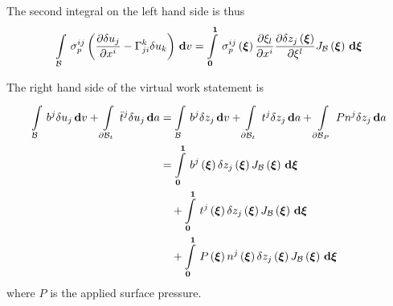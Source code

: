 The second integral on the left hand side is thus
\begin{equation}
  \gint{\embedmanifold{B}}{}{\sigma^{ij}_{p}\pbrac{\delby{\delta
        u_{j}}{x^{i}}-\christoffel{k}{j}{i}\delta u_{k}}}{v}=
  \gint{\vectr{0}}{\vectr{1}}{\fnof{\sigma^{ij}_{p}}{\vectr{\xi}}
    \delby{\xi_{l}}{x^{i}}\delby{\delta\fnof{z_{j}}{\vectr{\xi}}}{\xi^{l}}
    \fnof{J_{\embedmanifold{B}}}{\vectr{\xi}}}{\vectr{\xi}}
\end{equation}

The right hand side of the virtual work statement is
\begin{equation}
  \begin{split}
    \gint{\embedmanifold{B}}{}{b^{j}\delta u_{j}}{v}+
    \gint{\boundary{\embedmanifold{B}_{t}}}{}{\bar{t}^{j}\delta u_{j}}{a}
    &= \gint{\embedmanifold{B}}{}{b^{j}\delta z_{j}}{v}+
    \gint{\boundary{\embedmanifold{B}_{t}}}{}{t^{j}\delta z_{j}}{a} +
    \gint{\boundary{\embedmanifold{B}_{P}}}{}{Pn^{j}\delta z_{j}}{a} \\
    &= \gint{\vectr{0}}{\vectr{1}}{\fnof{b^{j}}{\vectr{\xi}}\delta
      \fnof{z_{j}}{\vectr{\xi}}\fnof{J_{\embedmanifold{B}}}{\vectr{\xi}}}{\vectr{\xi}}\\
    &\quad+\gint{\vectr{0}}{\vectr{1}}{\fnof{t^{j}}{\vectr{\xi}}\delta
      \fnof{z_{j}}{\vectr{\xi}}\fnof{J_{\embedmanifold{B}}}{\vectr{\xi}}}{\vectr{\xi}}\\ 
    &\quad+\gint{\vectr{0}}{\vectr{1}}{\fnof{P}{\vectr{\xi}}\fnof{n^{j}}{\vectr{\xi}}\delta
      \fnof{z_{j}}{\vectr{\xi}}\fnof{J_{\embedmanifold{B}}}{\vectr{\xi}}}{\vectr{\xi}}    
   \end{split}
\end{equation}
where $P$ is the applied surface pressure.

